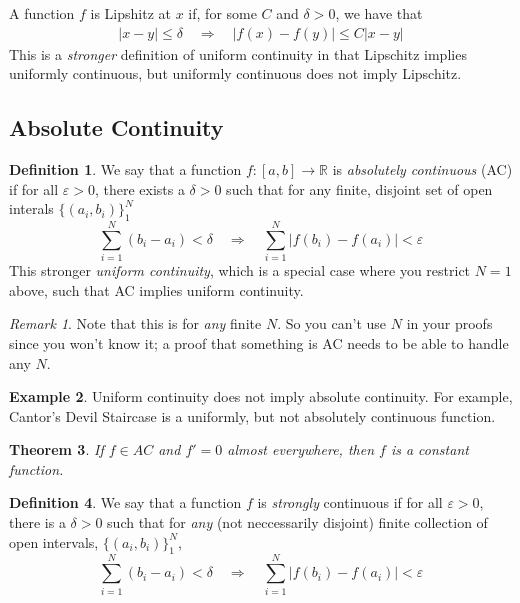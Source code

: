 \documentclass[12pt]{article}
\theoremstyle{plain}
\newtheorem{thm}{Theorem}[subsection]
\theoremstyle{definition}
\newtheorem{defn}[thm]{Definition}
\newtheorem{ex}[thm]{Example}
\theoremstyle{remark}
\newtheorem*{rmk}{Remark}
\begin{document}
A function $f$ is Lipshitz at $x$ if, for some $C$ and $\delta>0$, we have that 
\begin{align*}
    |x-y|\leq \delta \quad \Rightarrow \quad 
        |f(x) - f(y)|\leq C|x-y|
\end{align*}
This is a \emph{stronger} definition of uniform continuity in that Lipschitz implies uniformly continuous, but uniformly continuous does not imply Lipschitz. 


\subsection{Absolute Continuity \label{app.abscont}}

\begin{defn}
We say that a function $f:[a,b]\rightarrow\mathbb{R}$ is \emph{absolutely continuous} (AC) if for all $\varepsilon>0$, there exists a $\delta>0$ such that for any finite, disjoint set of open interals $\{(a_i,b_i)\}_1^N$ 
\[
    \sum_{i=1}^N (b_i-a_i)<\delta
    \quad\Rightarrow\quad
    \sum_{i=1}^N |f(b_i)-f(a_i)|<\varepsilon
\]
This stronger \emph{uniform continuity}, which is a special case where you restrict $N=1$ above, such that AC implies uniform continuity.
\end{defn}
\begin{rmk}
Note that this is for \emph{any} finite $N$. So you can't use $N$ in your proofs since you won't know it; a proof that something is AC needs to be able to handle any $N$. 
\end{rmk}

\begin{ex}
Uniform continuity does not imply absolute continuity. For example, Cantor's Devil Staircase is a uniformly, but not absolutely continuous function.
\end{ex}

\begin{thm}
If $f\in AC$ and $f'=0$ almost everywhere, then $f$ is a constant function.
\end{thm}

\begin{defn}
We say that a function $f$ is \emph{strongly} continuous if for all $\varepsilon>0$, there is a $\delta>0$ such that for \emph{any} (not neccessarily disjoint) finite collection of open intervals, $\{(a_i,b_i)\}^N_1$, 
\[
    \sum_{i=1}^N (b_i-a_i) < \delta
    \quad\Rightarrow\quad
    \sum_{i=1}^N |f(b_i)-f(a_i)| <\varepsilon
\]
\end{defn}
\end{document}
